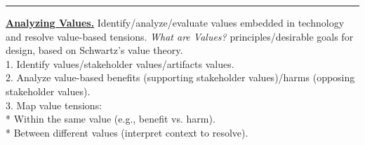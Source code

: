 \documentclass[8pt, a4paper]{extarticle}
\makeatletter
\renewcommand{\hline}{\noalign{\vskip 2px}\hrule\@height\arrayrulewidth\@width\linewidth\noalign{\vskip 2px}}
\makeatother
\begin{document}
\begin{minipage}[t]{0.49\textwidth}
{\begin{minipage}[t]{1\textwidth}
\begin{minipage}[t]{0.5\textwidth}
				\vspace*{-15px}\hline
				\ul{\textbf{Analyzing Values.}} Identify/analyze/evaluate values embedded in technology and resolve value-based tensions.
				\textit{What are Values?} principles/desirable goals for design, based on Schwartz’s value theory.\\
				1. Identify values/stakeholder values/artifacts values.\\
				2. Analyze value-based benefits (supporting stakeholder values)/harms (opposing stakeholder values).\\
				3. Map value tensions:\\
				* Within the same value (e.g., benefit vs. harm).\\
				* Between different values (interpret context to resolve).
			\end{minipage}\\
		\end{minipage}}
\end{minipage}\newpage
\end{document}
